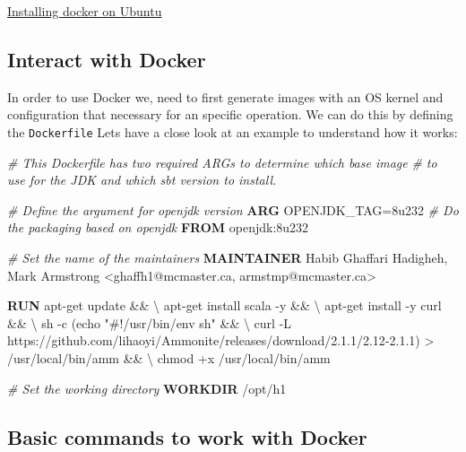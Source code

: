\documentclass[11pt]{article}
\newenvironment{Shaded}{}{}
\newcommand{\KeywordTok}[1]{\textcolor[rgb]{0.00,0.44,0.13}{\textbf{{#1}}}}
\newcommand{\StringTok}[1]{\textcolor[rgb]{0.25,0.44,0.63}{{#1}}}
\newcommand{\CommentTok}[1]{\textcolor[rgb]{0.38,0.63,0.69}{\textit{{#1}}}}
\newcommand{\NormalTok}[1]{{#1}}
\begin{document}
\href{https://docs.docker.com/engine/install/ubuntu/}{Installing docker
on Ubuntu}

\hypertarget{interact-with-docker}{%
\subsection{Interact with Docker}\label{interact-with-docker}}

In order to use Docker we, need to first generate images with an OS
kernel and configuration that necessary for an specific operation. We
can do this by defining the \texttt{Dockerfile} Lets have a close look
at an example to understand how it works:

    \begin{Shaded}
\begin{Highlighting}[]

\CommentTok{\# This Dockerfile has two required ARGs to determine which base image}
\CommentTok{\# to use for the JDK and which sbt version to install.}

\CommentTok{\# Define the argument for openjdk version}
\KeywordTok{ARG}\NormalTok{ OPENJDK\_TAG=8u232}
\CommentTok{\# Do the packaging based on openjdk}
\KeywordTok{FROM}\NormalTok{ openjdk:8u232}

\CommentTok{\# Set the name of the maintainers}
\KeywordTok{MAINTAINER}\NormalTok{ Habib Ghaffari Hadigheh, Mark Armstrong \textless{}ghaffh1@mcmaster.ca, armstmp@mcmaster.ca\textgreater{}}

\KeywordTok{RUN}\NormalTok{ apt{-}get update \&\& \textbackslash{}}
\NormalTok{  apt{-}get install scala {-}y \&\& \textbackslash{}}
\NormalTok{  apt{-}get install {-}y curl \&\& \textbackslash{}}
\NormalTok{  sh {-}c }\StringTok{\textquotesingle{}(echo "\#!/usr/bin/env sh" \&\& \textbackslash{}}
\StringTok{  curl {-}L https://github.com/lihaoyi/Ammonite/releases/download/2.1.1/2.12{-}2.1.1) \textgreater{} /usr/local/bin/amm \&\& \textbackslash{}}
\StringTok{  chmod +x /usr/local/bin/amm\textquotesingle{}}

\CommentTok{\# Set the working directory}
\KeywordTok{WORKDIR}\NormalTok{ /opt/h1}
\end{Highlighting}
\end{Shaded}

    \hypertarget{basic-commands-to-work-with-docker}{%
\subsection{Basic commands to work with
Docker}\label{basic-commands-to-work-with-docker}}
\end{document}
